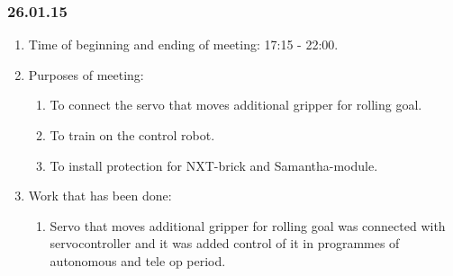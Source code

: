 \subsubsection{26.01.15}
\begin{enumerate}
	
	\item Time of beginning and ending of meeting: 17:15 - 22:00.
	
	\item Purposes of meeting: 
	\begin{enumerate}
	
		\item To connect the servo that moves additional gripper for rolling goal.
		
		\item To train on the control robot.
		
        \item To install protection for NXT-brick and Samantha-module.
		
	\end{enumerate}

	\item Work that has been done:
	\begin{enumerate}
		
		\item Servo that moves additional gripper for rolling goal was connected with servocontroller and it was added control of it in programmes of autonomous and tele op period.
		

\end{enumerate}
\end{enumerate}
